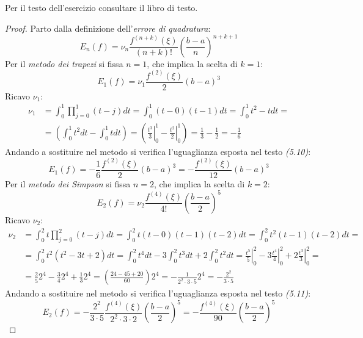 \begin{exercise}[5.3] 
Per il testo dell'esercizio consultare il libro di testo.
\end{exercise}
\begin{proof}
Parto dalla definizione dell'\emph{errore di quadratura}:
\begin{displaymath}
E_{n}(f) =
\nu_{n}\frac{f^{(n+k)}(\xi)}{(n+k)!}\left(\frac{b-a}{n}\right)^{n+k+1}
\end{displaymath}
Per il \emph{metodo dei trapezi} si fissa $n = 1$, che implica la scelta di $k
= 1$:
\begin{displaymath}
E_{1}(f) =
\nu_{1}\frac{f^{(2)}(\xi)}{2}\left(b-a\right)^{3}
\end{displaymath}
Ricavo $\nu_{1}$:
\begin{displaymath}
\begin{split}
\nu_{1} &= \int_{0}^{1}{\prod_{j=0}^{1}{(t-j)dt}} = 
\int_{0}^{1}{(t-0)(t-1)dt} = \int_{0}^{1}{t^{2}
-t dt} = \\ 
&= \left(\int_{0}^{1}{t^{2} dt} - \int_{0}^{1}{t dt}\right) = 
\left(\left.\frac{t^{3}}{3}\right |_{0}^{1} - \left.\frac{t^{2}}{2}
\right |_{0}^{1}\right) = \frac{1}{3} - \frac{1}{2} = -\frac{1}{6} 
\end{split}
\end{displaymath}
Andando a sostituire nel metodo si verifica l'uguaglianza esposta nel testo
\emph{(5.10)}:
\begin{displaymath}
E_{1}(f) =
-\frac{1}{6}\frac{f^{(2)}(\xi)}{2}\left(b-a\right)^{3} =
-\frac{f^{(2)}(\xi)}{12}\left(b-a\right)^{3}
\end{displaymath}
Per il \emph{metodo dei Simpson} si fissa $n = 2$, che implica la scelta di $k
= 2$:
\begin{displaymath}
E_{2}(f) =
\nu_{2}\frac{f^{(4)}(\xi)}{4!}\left(\frac{b-a}{2}\right)^{5}
\end{displaymath} 
Ricavo $\nu_{2}$:
\begin{displaymath}
\begin{split}
\nu_{2} &= \int_{0}^{2}{t \prod_{j=0}^{2}{(t-j)dt}} = 
\int_{0}^{2}{t(t-0)(t-1)(t-2)dt} = \int_{0}^{2}{t^{2}(t-1)(t-2)dt} = \\
&= \int_{0}^{2}{t^{2}(t^{2}-3t+2)dt} = 
\int_{0}^{2}{t^{4}dt} -3\int_{0}^{2}{t^{3}dt} +2\int_{0}^{2}{t^{2}dt} = 
\left.\frac{t^{5}}{5}\right |_{0}^{2} - 3\left.\frac{t^{4}}{4}\right |_{0}^{2} +
2 \left.\frac{t^{3}}{3}\right |_{0}^{2} = \\
&= \frac{2}{5}2^{4} -\frac{3}{4}2^{4} + \frac{1}{3}2^{4} =
\left(\frac{24-45+20}{60}\right)2^{4} = -\frac{1}{2^{2}\cdot 3 \cdot 5}2^{4} =
-\frac{2^{2}}{3\cdot 5}
\end{split}
\end{displaymath}
Andando a sostituire nel metodo si verifica l'uguaglianza esposta nel testo
\emph{(5.11)}:
\begin{displaymath}
E_{2}(f) =
-\frac{2^{2}}{3\cdot 5}\frac{f^{(4)}(\xi)}{2^{2} \cdot
3 \cdot 2}\left(\frac{b-a}{2}\right)^{5} =
-\frac{f^{(4)}(\xi)}{90}\left(\frac{b-a}{2}\right)^{5}
\end{displaymath}
\end{proof}

